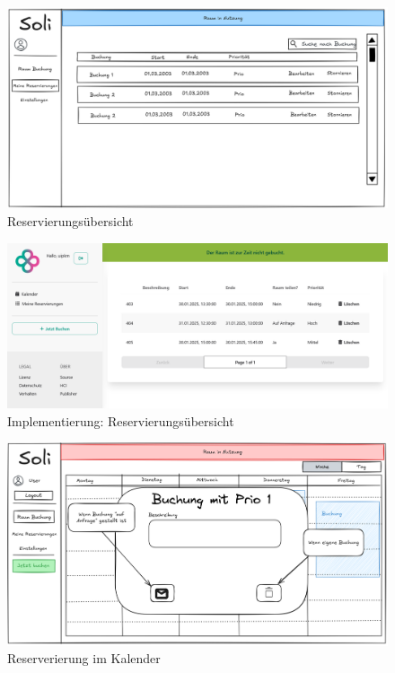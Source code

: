 \begin{figure}[ht]
    \includegraphics[width=\textwidth]{figures/mockup/bookings_list}
    \caption{Reservierungsübersicht}
    \label{fig:overview}
\end{figure}
\begin{figure}[ht]
    \includegraphics[width=\textwidth]{figures/impl-views/bookings_list}
    \caption{Implementierung: Reservierungsübersicht}
    \label{fig:impl-overview}
\end{figure}
\clearpage
\begin{figure}
    \centering
    \includegraphics[width=\textwidth]{figures/mockup/bookings_single}
    \caption{Reserverierung im Kalender}
    \label{fig:calendarviewbooking}
\end{figure}

